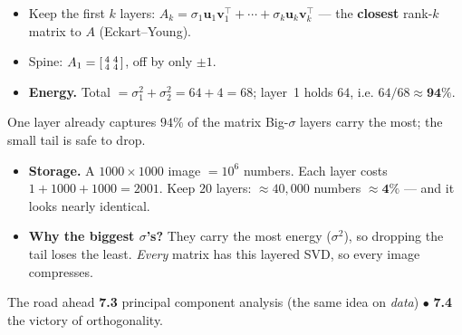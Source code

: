 \documentclass[aspectratio=169, 11pt]{beamer}
\newcommand{\uu}{\mathbf{u}}
\newcommand{\vv}{\mathbf{v}}
\newcommand{\T}{^{\top}}
\begin{document}
\begin{frame}[t, plain]
  \begin{itemize}
    \setlength{\itemsep}{6pt}
    \item Keep the first $k$ layers: $A_k=\sigma_1\uu_1\vv_1\T+\cdots+\sigma_k\uu_k\vv_k\T$ --- the
          \textbf{closest} rank-$k$ matrix to $A$ (Eckart--Young).
    \item Spine: $A_1=\begin{bsmallmatrix} 4 & 4\\ 4 & 4 \end{bsmallmatrix}$, off by only $\pm1$.
    \item \textbf{Energy.} Total $=\sigma_1^2+\sigma_2^2=64+4=68$; layer~1 holds $64$, i.e.
          $64/68\approx\mathbf{94\%}$.
  \end{itemize}
  \vspace{2pt}
  \begin{block}{One layer already captures $94\%$ of the matrix}
    Big-$\sigma$ layers carry the most; the small tail is safe to drop.
  \end{block}
\end{frame}

\begin{frame}[t, plain]
  \begin{itemize}
    \setlength{\itemsep}{6pt}
    \item \textbf{Storage.} A $1000\times1000$ image $=10^6$ numbers. Each layer costs $1+1000+1000=2001$.
          Keep $20$ layers: $\approx40{,}000$ numbers $\approx\mathbf{4\%}$ --- and it looks nearly identical.
    \item \textbf{Why the biggest $\sigma$'s?} They carry the most energy ($\sigma^2$), so dropping the tail
          loses the least. \emph{Every} matrix has this layered SVD, so every image compresses.
  \end{itemize}
  \vspace{2pt}
  \begin{block}{The road ahead}
    \textbf{7.3} principal component analysis (the same idea on \emph{data}) \;$\bullet$\; \textbf{7.4} the
    victory of orthogonality.
  \end{block}
\end{frame}
\end{document}
